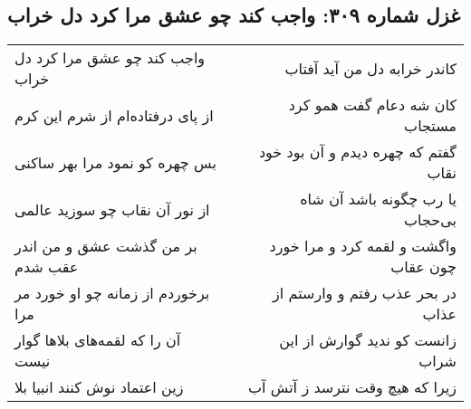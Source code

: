 \begin{center}
\section*{غزل شماره ۳۰۹: واجب کند چو عشق مرا کرد دل خراب}
\label{sec:0309}
\begin{longtable}{l p{0.5cm} r}
واجب کند چو عشق مرا کرد دل خراب
&&
کاندر خرابه دل من آید آفتاب
\\
از پای درفتاده‌ام از شرم این کرم
&&
کان شه دعام گفت همو کرد مستجاب
\\
بس چهره کو نمود مرا بهر ساکنی
&&
گفتم که چهره دیدم و آن بود خود نقاب
\\
از نور آن نقاب چو سوزید عالمی
&&
یا رب چگونه باشد آن شاه بی‌حجاب
\\
بر من گذشت عشق و من اندر عقب شدم
&&
واگشت و لقمه کرد و مرا خورد چون عقاب
\\
برخوردم از زمانه چو او خورد مر مرا
&&
در بحر عذب رفتم و وارستم از عذاب
\\
آن را که لقمه‌های بلاها گوار نیست
&&
زانست کو ندید گوارش از این شراب
\\
زین اعتماد نوش کنند انبیا بلا
&&
زیرا که هیچ وقت نترسد ز آتش آب
\\
\end{longtable}
\end{center}
